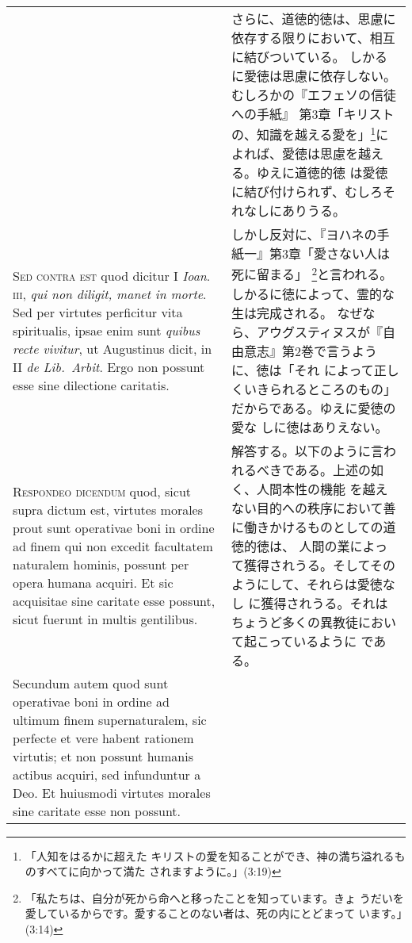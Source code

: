 \documentclass[10pt]{jsarticle}
\begin{document}
\begin{longtable}{p{21em}p{21em}}
 
&

 さらに、道徳的徳は、思慮に依存する限りにおいて、相互に結びついている。
 しかるに愛徳は思慮に依存しない。むしろかの『エフェソの信徒への手紙』
 第3章「キリストの、知識を越える愛を」\footnote{「人知をはるかに超えた
 キリストの愛を知ることができ、神の満ち溢れるものすべてに向かって満た
 されますように。」(3:19)}によれば、愛徳は思慮を越える。ゆえに道徳的徳
 は愛徳に結び付けられず、むしろそれなしにありうる。

\\


 {\scshape Sed contra est} quod dicitur I {\itshape Ioan}.~{\scshape
 iii}, {\itshape qui non diligit, manet in morte}. Sed per virtutes
 perficitur vita spiritualis, ipsae enim sunt {\itshape quibus recte
 vivitur}, ut Augustinus dicit, in II {\itshape de Lib.~Arbit}. Ergo
 non possunt esse sine dilectione caritatis.
 
&

 しかし反対に、『ヨハネの手紙一』第3章「愛さない人は死に留まる」
 \footnote{「私たちは、自分が死から命へと移ったことを知っています。きょ
 うだいを愛しているからです。愛することのない者は、死の内にとどまって
 います。」(3:14)}と言われる。しかるに徳によって、霊的な生は完成される。
 なぜなら、アウグスティヌスが『自由意志』第2巻で言うように、徳は「それ
 によって正しくいきられるところのもの」だからである。ゆえに愛徳の愛な
 しに徳はありえない。

\\


 {\scshape Respondeo dicendum} quod, sicut supra dictum est, virtutes
 morales prout sunt operativae boni in ordine ad finem qui non excedit
 facultatem naturalem hominis, possunt per opera humana acquiri.  Et
 sic acquisitae sine caritate esse possunt, sicut fuerunt in multis
 gentilibus.
 
&

 解答する。以下のように言われるべきである。上述の如く、人間本性の機能
 を越えない目的への秩序において善に働きかけるものとしての道徳的徳は、
 人間の業によって獲得されうる。そしてそのようにして、それらは愛徳なし
 に獲得されうる。それはちょうど多くの異教徒において起こっているように
 である。


\\


 Secundum autem quod sunt operativae boni in ordine ad ultimum finem
 supernaturalem, sic perfecte et vere habent rationem virtutis; et non
 possunt humanis actibus acquiri, sed infunduntur a Deo. Et huiusmodi
 virtutes morales sine caritate esse non possunt.
 

\end{longtable}
\end{document}
